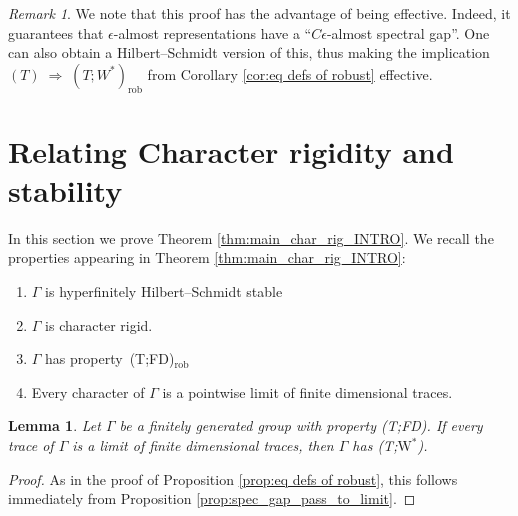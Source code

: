 \documentclass[11pt]{amsart}
\newtheorem{lemma}[theorem]{Lemma}
\theoremstyle{definition}
\theoremstyle{remark}
\newtheorem{remark}[theorem]{Remark}
\theoremstyle{definition}
\begin{document}
\begin{remark}
 We note that this proof has the advantage of being effective. Indeed, it guarantees that $\epsilon$-almost representations have a ``$C\epsilon$-almost spectral gap''. One can also obtain a Hilbert–Schmidt version of this, thus making the implication
$(T)\;\Rightarrow\;(T;W^*)_{\mathrm{rob}}$ from Corollary \ref{cor:eq defs of robust}
 effective.
\end{remark}

\section{Relating Character rigidity and stability}\label{sec:char_rigidity}

In this section we  prove Theorem \ref{thm:main_char_rig_INTRO}. 
We recall the properties appearing in Theorem \ref{thm:main_char_rig_INTRO}:
\begin{enumerate}
    \item $\Gamma$ is hyperfinitely Hilbert--Schmidt stable
    \item $\Gamma$ is character rigid.
    \item $\Gamma$  has property~(T;FD)$_\mathrm{rob}$
    \item Every character of $\Gamma$ is a pointwise limit of finite dimensional traces.
\end{enumerate}


\begin{lemma}\label{lem:limits-of-fd implies (T;tr)}
    Let $\Gamma$ be a finitely generated group with property (T;FD). If every trace of $\Gamma$ is a limit of finite dimensional traces, then $\Gamma$ has (T;$\mathrm{W}^*$).
\end{lemma}
\begin{proof}
As in the proof of Proposition    \ref{prop:eq defs of robust}, this follows immediately from Proposition \ref{prop:spec_gap_pass_to_limit}.
\end{proof}
\end{document}
